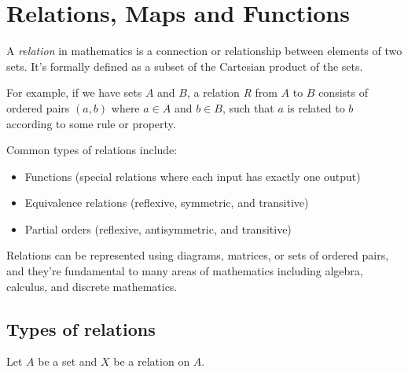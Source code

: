 \newpage
\section{Relations, Maps and Functions}

A \emph{relation} in mathematics is a connection or relationship between elements of two sets. It's 
formally defined as a subset of the Cartesian product of the sets.
\vspace{\baselineskip}

For example, if we have sets \(A\) and \(B\), a relation \emph{R} from \(A\) to \(B\) consists
of ordered pairs \((a,b)\) where \(a \in A\) and \(b \in B\), such that \(a\) is related to \(b\) 
according to some rule or property.
\vspace{\baselineskip}

Common types of relations include:

\begin{itemize}

	\item Functions (special relations where each input has exactly one output)

	\item Equivalence relations (reflexive, symmetric, and transitive)

	\item Partial orders (reflexive, antisymmetric, and transitive)

\end{itemize}

Relations can be represented using diagrams, matrices, or sets of
ordered pairs, and they're fundamental to many areas of mathematics including algebra, calculus, and 
discrete mathematics.

\subsection{Types of relations}

Let \(A\) be a set and \(X\) be a relation on \(A\).

